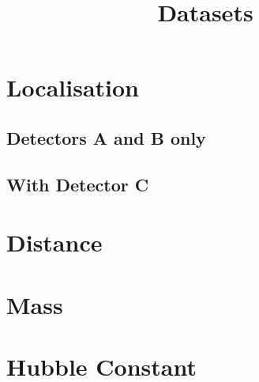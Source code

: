 \documentclass[14pt,a4paper]{extarticle}
\title{Datasets}
\author{}
\date{}
\begin{document}
\section*{Localisation}
\subsection*{Detectors A and B only}

\subsection*{With Detector C}

\clearpage
\section*{Distance}

\section*{Mass}

\clearpage
\section*{Hubble Constant}

\end{document}
